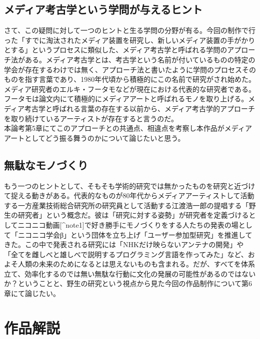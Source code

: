 \section{メディア考古学という学問が与えるヒント}\label{ux30e1ux30c7ux30a3ux30a2ux8003ux53e4ux5b66ux3068ux3044ux3046ux5b66ux554fux304cux4e0eux3048ux308bux30d2ux30f3ux30c8}

さて、この疑問に対して一つのヒントと生る学問の分野が有る。今回の制作で行った「すでに淘汰されたメディア装置を研究し、新しいメディア装置の手がかりとする」というプロセスに類似した、メディア考古学と呼ばれる学問のアプローチ法がある。メディア考古学とは、考古学という名前が付いているものの特定の学会が存在するわけでは無く、アプローチ法と書いたように学問のプロセスそのものを指す言葉であり、1980年代頃から積極的にこの名前で研究がされ始めた。メディア研究者のエルキ・フータモなどが現在における代表的な研究者である。\\
フータモは論文内にて積極的にメディアアートと呼ばれるモノを取り上げる。メディア考古学と呼ばれる言葉の存在する以前から、メディア考古学的アプローチを取り続けているアーティストが存在すると言うのだ。\\
本論考第5章にてこのアプローチとの共通点、相違点を考察し本作品がメディアアートとしてどう振る舞うのかについて論じたいと思う。

\section{無駄なモノづくり}\label{ux7121ux99c4ux306aux30e2ux30ceux3065ux304fux308a}

もう一つのヒントとして、そもそも学術的研究では無かったものを研究と近づけて捉える動きがある。代表的なものが80年代からメディアアーティストして活動する一方産業技術総合研究所の研究員として活動する江渡浩一郎の提唱する「野生の研究者」という概念だ。彼は「研究に対する姿勢」が研究者を定義づけるとしてニコニコ動画{[}\^{}note1{]}で好き勝手にモノづくりをする人たちの発表の場として「ニコニコ学会β」という団体を立ち上げ「ユーザー参加型研究」を推進してきた。この中で発表される研究には「NHKだけ映らないアンテナの開発」や「全てを雌しべと雄しべで説明するプログラミング言語を作ってみた」など、およそ人類の未来のためになるとは思えないものも含まれる。だが、すべてを体系立て、効率化するのでは無い無駄な行動に文化の発展の可能性があるのではないか？ということと、野生の研究という視点から見た今回の作品制作について第6章にて論じたい。

\chapter{作品解説}\label{ux4f5cux54c1ux89e3ux8aac}

